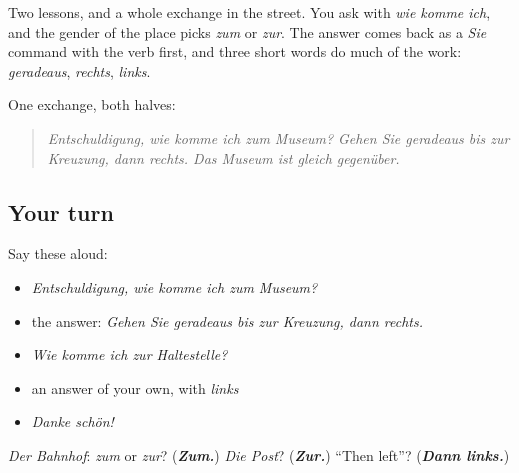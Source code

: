 \begin{grammarlens}[title={What you've built}]
Two lessons, and a whole exchange in the street. You ask with \emph{wie komme ich}, and the gender of the place picks \emph{zum} or \emph{zur}. The answer comes back as a \emph{Sie} command with the verb first, and three short words do much of the work: \emph{geradeaus}, \emph{rechts}, \emph{links}.

One exchange, both halves:

\begin{quote}
\emph{Entschuldigung, wie komme ich zum Museum?} \emph{Gehen Sie geradeaus bis zur Kreuzung, dann rechts. Das Museum ist gleich gegenüber.}
\end{quote}
\end{grammarlens}

\subsection*{Your turn}
Say these aloud:

\begin{itemize}
\raggedright
  \item \emph{Entschuldigung, wie komme ich zum Museum?}
  \item the answer: \emph{Gehen Sie geradeaus bis zur Kreuzung, dann rechts.}
  \item \emph{Wie komme ich zur Haltestelle?}
  \item an answer of your own, with \emph{links}
  \item \emph{Danke schön!}
\end{itemize}

\begin{tcolorbox}[breakable,colback=teal!4,colframe=teal!35!black,title={Before you move on}]
\emph{Der Bahnhof}: \emph{zum} or \emph{zur}? (\emph{\textbf{Zum.}}) \emph{Die Post}? (\emph{\textbf{Zur.}}) \textquotedblleft{}Then left\textquotedblright{}? (\emph{\textbf{Dann links.}})
\end{tcolorbox}

